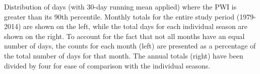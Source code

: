 \label{fig:annual_distribution}
Distribution of days (with 30-day running mean applied) where the PWI is greater than its 90th percentile. Monthly totals for the entire study period (1979-2014) are shown on the left, while the total days for each individual season are shown on the right. To account for the fact that not all months have an equal number of days, the counts for each month (left) are presented as a percentage of the total number of days for that month. The annual totals (right) have been divided by four for ease of comparison with the individual seasons.   